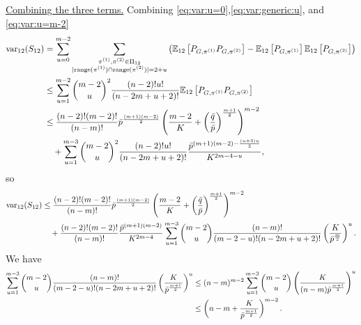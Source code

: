 \documentclass[final]{colt2026}
\newcommand{\1}{\mathbf{1}}
\newcommand{\bbE}{\mathbb{E}}
\newcommand{\pa}[1]{\left(#1\right)}
\newcommand{\cro}[1]{\left[#1\right]}
\begin{document}
\noindent\underline{Combining the three terms.}
Combining \eqref{eq:var:u=0},\eqref{eq:var:generic:u}, and \eqref{eq:var:u=m-2}
\begin{align*}
\text{var}_{12}(S_{12}) &= \sum_{u=0}^{m-2} \sum_{\substack{\pi^{(1)},\pi^{(2)}\in \Pi_{12}\\ |\text{range}(\pi^{(1)})\cap \text{range}(\pi^{(2)})|=2+u}}
\pa{\bbE_{12}\cro{P_{G,\pi^{(1)}}P_{G,\pi^{(2)}}}-\bbE_{12}\cro{P_{G,\pi^{(1)}}}\bbE_{12}\cro{P_{G,\pi^{(2)}}}}\\
& \leq   \sum_{u=1}^{m-2}   \binom{m-2}{u}^{2} {(n-2)!u!\over (n-2m+u+2)!}  \bbE_{12}\cro{P_{G,\pi^{(1)}}P_{G,\pi^{(2)}}}\\
& \leq {(n-2)! (m-2)!\over (n-m)!} \bar p^{(m+1)(m-2)\over 2} \pa{{m-2 \over K}+\pa{\bar q\over \bar p}^{{m+1\over 2}}}^{m-2} \\ &\quad 
+\sum_{u=1}^{m-3}   \binom{m-2}{u}^{2} {(n-2)!u!\over (n-2m+u+2)!} {\bar p^{(m+1)(m-2)-{(u+3)u\over 2}} \over K^{2m-4-u}}
, 
\end{align*}
so
\begin{align*}
 \text{var}_{12}(S_{12}) & \leq {(n-2)! (m-2)!\over (n-m)!} \bar p^{(m+1)(m-2)\over 2} \pa{{m-2 \over K}+\pa{\bar q\over \bar p}^{{m+1\over 2}}}^{m-2} \\
&\quad +{(n-2)!(m-2)!\over (n-m)!}{\bar p^{(m+1)(m-2)} \over K^{2m-4}}\sum_{u=1}^{m-3}   \binom{m-2}{u} {(n-m)!\over (m-2-u)!(n-2m+u+2)!} \pa{K\over \bar p^{{m\over 2}} }^{u}.
\end{align*}
We have 
\begin{align*}
\sum_{u=1}^{m-3}   \binom{m-2}{u} {(n-m)!\over (m-2-u)!(n-2m+u+2)!} \pa{K\over \bar p^{{m+1\over 2}} }^{u}
&\leq (n-m)^{m-2} \sum_{u=1}^{m-3}  \binom{m-2}{u}  \pa{K\over (n-m)\bar p^{m+1\over 2}}^{u}\\
&\leq  \pa{n-m+{K\over \bar p^{m+1\over 2}}}^{m-2}.
\end{align*}
\end{document}
